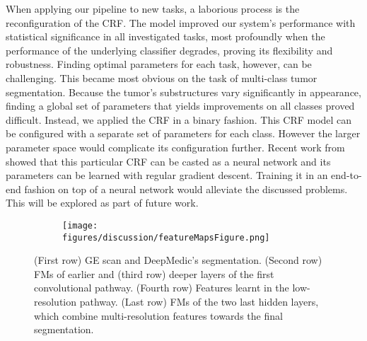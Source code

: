 \documentclass[preprint,authoryear,12pt]{elsarticle}
\begin{document}
When applying our pipeline to new tasks, a laborious process is the reconfiguration of the CRF. The model improved our system's performance with statistical significance in all investigated tasks, most profoundly when the performance of the underlying classifier degrades, proving its flexibility and robustness. Finding optimal parameters for each task, however, can be challenging. This became most obvious on the task of multi-class tumor segmentation. Because the tumor's substructures vary significantly in appearance, finding a global set of parameters that yields improvements on all classes proved difficult. Instead, we applied the CRF in a binary fashion. This CRF model can be configured with a separate set of parameters for each class. However the larger parameter space would complicate its configuration further. Recent work from \cite{Zheng2015} showed that this particular CRF can be casted as a neural network and its parameters can be learned with regular gradient descent. Training it in an end-to-end fashion on top of a neural network would alleviate the discussed problems. This will be explored as part of future work.


\begin{figure}[!h]
\vspace{-20pt}
\centering
\begin{subfigure}[b]{0.95\textwidth}
	\centering
	\texttt{[image: figures/discussion/featureMapsFigure.png]}
\end{subfigure}
\vspace{-5pt} \caption{(First row) GE scan and DeepMedic's segmentation. (Second row) FMs of earlier and (third row) deeper layers of the first convolutional pathway. (Fourth row) Features learnt in the low-resolution pathway. (Last row) FMs of the two last hidden layers, which combine multi-resolution features towards the final segmentation.}
\label{fig:featureMaps}
\end{figure}
%
 
\end{document}
